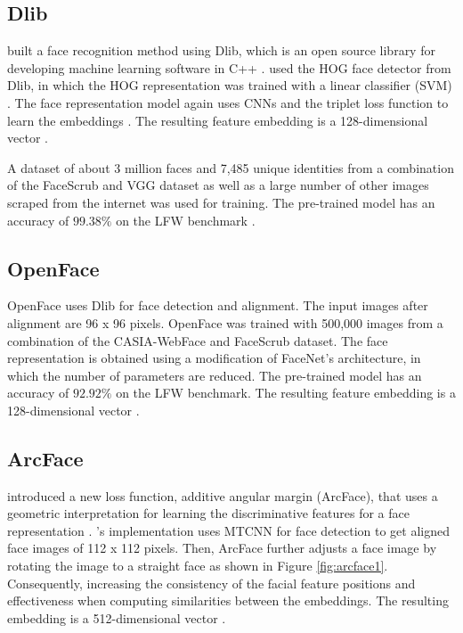 \documentclass[12pt,english]{article}
\begin{document}
\subsection{Dlib}
\quad
\cite{geitgey} built a face recognition method using Dlib, which is an open source library for developing machine learning software in C++ \cite{king}. \cite{geitgey} used the HOG face detector from Dlib, in which the HOG representation was trained with a linear classifier (SVM) \cite{king2014}. The face representation model again uses CNNs and the triplet loss function to learn the embeddings \cite{king2017}. The resulting feature embedding is a 128-dimensional vector \cite{king2017}. 

A dataset of about 3 million faces and 7,485 unique identities from a combination of the FaceScrub and VGG dataset as well as a large number of other images scraped from the internet was used for training. The pre-trained model has an accuracy of $99.38\%$ on the LFW benchmark \cite{king2017}.


\subsection{OpenFace}
\quad
OpenFace uses Dlib for face detection and alignment. The input images after alignment are 96 x 96 pixels. OpenFace was trained with 500,000 images from a combination of the CASIA-WebFace and FaceScrub dataset. The face representation is obtained using a modification of FaceNet's architecture, in which the number of parameters are reduced. The pre-trained model has an accuracy of $92.92\%$ on the LFW benchmark. The resulting feature embedding is a 128-dimensional vector \cite{amos}.

\subsection{ArcFace}
\quad
\cite{deng} introduced a new loss function, additive angular margin (ArcFace), that uses a geometric interpretation for learning the discriminative features for a face representation \cite{deng}. \cite{deng2019}'s implementation uses MTCNN for face detection to get aligned face images of 112 x 112 pixels. Then, ArcFace further adjusts a face image by rotating the image to a straight face as shown in Figure \ref{fig:arcface1}. Consequently, increasing the consistency of the facial feature positions and effectiveness when computing similarities between the embeddings. The resulting embedding is a 512-dimensional vector \cite{deng}.
\end{document}
